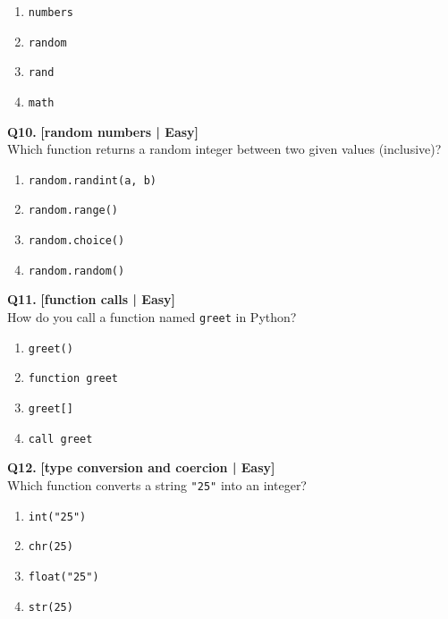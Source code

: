 \begin{enumerate}[label=(\alph*),topsep=2pt,itemsep=1pt,partopsep=0pt,parsep=0pt]
    \item \relax \texttt{numbers}
    \item \relax \texttt{random}
    \item \relax \texttt{rand}
    \item \relax \texttt{math}
\end{enumerate}
\vspace{2mm}

\noindent\textbf{Q10.} \hfill {\small\color{LPUOrange}\textbf{[random numbers | Easy]}}\\[2pt]
Which function returns a random integer between two given values (inclusive)?

\begin{enumerate}[label=(\alph*),topsep=2pt,itemsep=1pt,partopsep=0pt,parsep=0pt]
    \item \relax \texttt{random.randint(a, b)}
    \item \relax \texttt{random.range()}
    \item \relax \texttt{random.choice()}
    \item \relax \texttt{random.random()}
\end{enumerate}
\vspace{2mm}

\noindent\textbf{Q11.} \hfill {\small\color{LPUOrange}\textbf{[function calls | Easy]}}\\[2pt]
How do you call a function named \texttt{greet} in Python?

\begin{enumerate}[label=(\alph*),topsep=2pt,itemsep=1pt,partopsep=0pt,parsep=0pt]
    \item \relax \texttt{greet()}
    \item \relax \texttt{function greet}
    \item \relax \texttt{greet[]}
    \item \relax \texttt{call greet}
\end{enumerate}
\vspace{2mm}

\noindent\textbf{Q12.} \hfill {\small\color{LPUOrange}\textbf{[type conversion and coercion | Easy]}}\\[2pt]
Which function converts a string \texttt{"25"} into an integer?

\begin{enumerate}[label=(\alph*),topsep=2pt,itemsep=1pt,partopsep=0pt,parsep=0pt]
    \item \relax \texttt{int("25")}
    \item \relax \texttt{chr(25)}
    \item \relax \texttt{float("25")}
    \item \relax \texttt{str(25)}
\end{enumerate}
\vspace{2mm}

